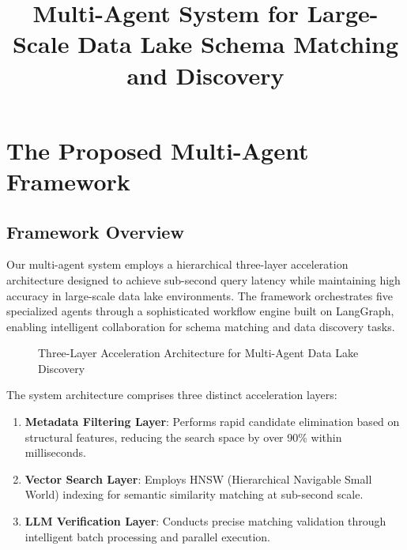 \documentclass[conference]{IEEEtran}
\begin{document}
\title{Multi-Agent System for Large-Scale Data Lake Schema Matching and Discovery}

\author{
}

\maketitle


\section{The Proposed Multi-Agent Framework}

\subsection{Framework Overview}

Our multi-agent system employs a hierarchical three-layer acceleration architecture designed to achieve sub-second query latency while maintaining high accuracy in large-scale data lake environments. The framework orchestrates five specialized agents through a sophisticated workflow engine built on LangGraph, enabling intelligent collaboration for schema matching and data discovery tasks.

\begin{figure*}[!t]
    \centering
    \caption{Three-Layer Acceleration Architecture for Multi-Agent Data Lake Discovery}
    \label{fig:architecture}
\end{figure*}

The system architecture comprises three distinct acceleration layers:
\begin{enumerate}
    \item \textbf{Metadata Filtering Layer}: Performs rapid candidate elimination based on structural features, reducing the search space by over 90\% within milliseconds.
    \item \textbf{Vector Search Layer}: Employs HNSW (Hierarchical Navigable Small World) indexing for semantic similarity matching at sub-second scale.
    \item \textbf{LLM Verification Layer}: Conducts precise matching validation through intelligent batch processing and parallel execution.
\end{enumerate}
\end{document}

